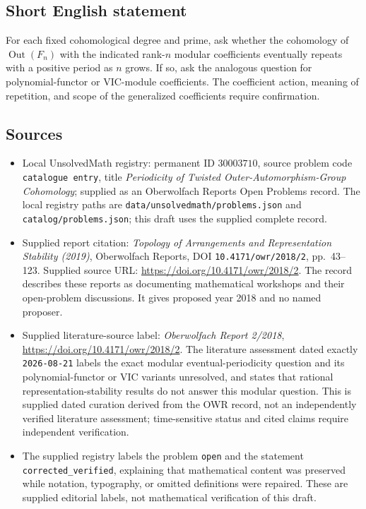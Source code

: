 \documentclass[11pt]{article}
\begin{document}
\subsection{Short English statement}
For each fixed cohomological degree and prime, ask whether the cohomology of \(\operatorname{Out}(F_n)\) with the indicated rank-\(n\) modular coefficients eventually repeats with a positive period as \(n\) grows. If so, ask the analogous question for polynomial-functor or VIC-module coefficients. The coefficient action, meaning of repetition, and scope of the generalized coefficients require confirmation.
\subsection{Sources}
\begin{itemize}
\item Local UnsolvedMath registry: permanent ID \(30003710\), source problem code \texttt{catalogue entry}, title \emph{Periodicity of Twisted Outer-Automorphism-Group Cohomology}; supplied as an Oberwolfach Reports Open Problems record. The local registry paths are \texttt{data/unsolvedmath/problems.json} and \texttt{catalog/problems.json}; this draft uses the supplied complete record.
\item Supplied report citation: \emph{Topology of Arrangements and Representation Stability (2019)}, Oberwolfach Reports, DOI \texttt{10.4171/owr/2018/2}, pp.\ 43--123. Supplied source URL: \url{https://doi.org/10.4171/owr/2018/2}. The record describes these reports as documenting mathematical workshops and their open-problem discussions. It gives proposed year 2018 and no named proposer.
\item Supplied literature-source label: \emph{Oberwolfach Report 2/2018}, \url{https://doi.org/10.4171/owr/2018/2}. The literature assessment dated exactly \texttt{2026-08-21} labels the exact modular eventual-periodicity question and its polynomial-functor or VIC variants unresolved, and states that rational representation-stability results do not answer this modular question. This is supplied dated curation derived from the OWR record, not an independently verified literature assessment; time-sensitive status and cited claims require independent verification.
\item The supplied registry labels the problem \texttt{open} and the statement \texttt{corrected\_verified}, explaining that mathematical content was preserved while notation, typography, or omitted definitions were repaired. These are supplied editorial labels, not mathematical verification of this draft.
\end{itemize}
\end{document}
